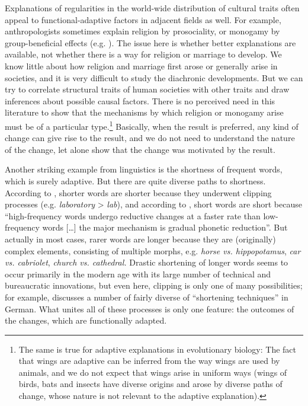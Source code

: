 \documentclass[output=paper]{langsci/langscibook}
\begin{document}
Explanations of regularities in the world-wide distribution of cultural traits often appeal to functional-adaptive factors in adjacent fields as well. For example, anthropologists sometimes explain religion by prosociality, or monogamy by group-beneficial effects (e.g. \citealt{PaciottiEtAl2011,HenrichEtAl2012}). The issue here is whether better explanations are available, not whether there is a way for religion or marriage to develop. We know little about how religion and marriage first arose or generally arise in societies, and it is very difficult to study the diachronic developments. But we can try to correlate structural traits of human societies with other traits and draw inferences about possible causal factors. There is no perceived need in this literature to show that the mechanisms by which religion or monogamy arise must be of a particular type.\footnote{The same is true for adaptive explanations in evolutionary biology: The fact that wings are adaptive can be inferred from the way wings are used by animals, and we do not expect that wings arise in uniform ways (wings of birds, bats and insects have diverse origins and arose by diverse paths of change, whose nature is not relevant to the adaptive explanation).} Basically, when the result is preferred, any kind of change can give rise to the result, and we do not need to understand the nature of the change, let alone show that the change was motivated by the result.

Another striking example from linguistics is the shortness of frequent words, which is surely adaptive. But there are quite diverse paths to shortness. According to \citet{Zipf1935}, shorter words are shorter because they underwent clipping processes (e.g. \textit{laboratory} > \textit{lab}), and according to \citet[12]{Bybee2007}, short words are short because “high-frequency words undergo reductive changes at a faster rate than low-frequency words […] the major mechanism is gradual phonetic reduction”. But actually in most cases, rarer words are longer because they are (originally) complex elements, consisting of multiple morphs, e.g. \textit{horse vs. hippopotamus}, \textit{car vs. cabriolet}, \textit{church vs. cathedral.} Drastic shortening of longer words seems to occur primarily in the modern age with its large number of technical and bureaucratic innovations, but even here, clipping is only one of many possibilities; for example, \citet{RonnebergerSibold2014} discusses a number of fairly diverse of “shortening techniques” in German. What unites all of these processes is only one feature: the outcomes of the changes, which are functionally adapted.
\end{document}
